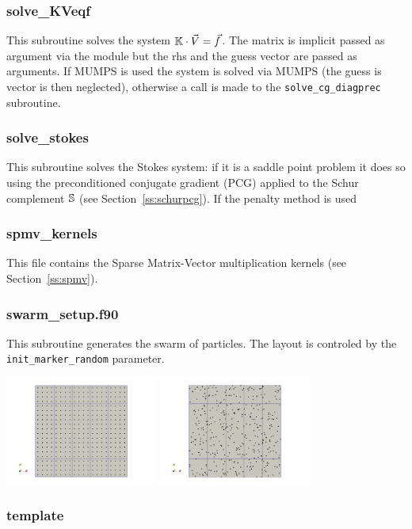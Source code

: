  \subsubsection{solve\_KVeqf}
 This subroutine solves the system ${\mathbb{K}}\cdot \vec{V} = \vec{f}$. The matrix is 
 implicit passed as argument via the module but the rhs and the guess vector are 
 passed as arguments.
 If MUMPS is used the system is solved via MUMPS (the guess is vector
 is then neglected), otherwise a call is made to  the {\tt solve\_cg\_diagprec} subroutine.
 \subsubsection{solve\_stokes}
 This subroutine solves the Stokes system: if it is a saddle point problem 
 it does so using the preconditioned conjugate gradient (PCG) applied 
 to the Schur complement ${\mathbb{S}}$  (see Section~\ref{ss:schurpcg}).
 If the penalty method is used 
 \subsubsection{spmv\_kernels}
 This file contains the Sparse Matrix-Vector multiplication kernels (see Section~\ref{ss:spmv}).
 \subsubsection{swarm\_setup.f90}
 This subroutine generates the swarm of particles. The layout is controled 
 by the {\tt init\_marker\_random} parameter.
 \begin{center}
 \includegraphics[width=5cm]{ELEFANT/images/swarm_reg} 
 \includegraphics[width=5cm]{ELEFANT/images/swarm_rand} 
 \end{center}
 \subsubsection{template}

